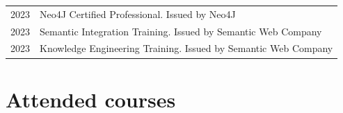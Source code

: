 \documentclass[11pt,fullpage]{article}
\begin{document}
\begin{longtable}{p{0.5in}|p{5.5in}}
  2023 & Neo4J Certified Professional. Issued by Neo4J \\ %
  2023 & Semantic Integration Training. Issued by Semantic Web Company \\ %
  2023 & Knowledge Engineering Training. Issued by Semantic Web Company \\ %
\end{longtable}

\section*{Attended courses}
\end{document}
